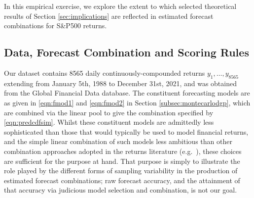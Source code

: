 \documentclass[12pt]{article}
\theoremstyle{definition}
\theoremstyle{remark}
\begin{document}
In this empirical exercise, we explore the extent to which selected theoretical results of Section \ref{sec:implications} are reflected in estimated forecast combinations for S\&P500 returns.

\subsection{Data, Forecast Combination and Scoring Rules\label{subsec:empdatacomb}}

Our dataset contains 8565 daily continuously-compounded returns $y_{1},\ldots ,y_{8565}$ extending from January 5th, 1988 to December 31st, 2021, and was obtained from the Global Financial Data database. The constituent forecasting models are as given in \eqref{eqn:fmod1} and \eqref{eqn:fmod2} in Section \ref{subsec:montecarlodgp}, which are combined via the linear pool to give the combination specified by \eqref{eqn:predcdfsim}. Whilst these constituent models are admittedly less sophisticated than those that would typically be used to model financial returns, and the simple linear combination of such models less ambitious than other combination approaches adopted in the returns literature (e.g.\ \citealp{Billio2013}), these choices are sufficient for the purpose at hand. That purpose is simply to illustrate the role played by the different forms of sampling variability in the production of estimated forecast combinations; raw forecast accuracy, and the attainment of that accuracy via judicious model selection and combination, is not our goal.
\end{document}

